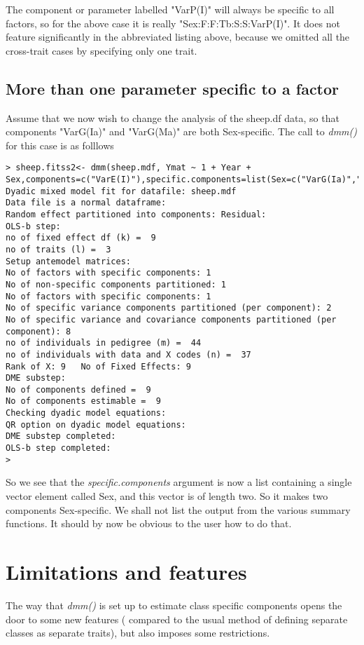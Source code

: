 \documentclass[titlepage]{article}  %
\begin{document}
The component or parameter labelled "VarP(I)" will always be specific to  all factors, so for the above case it is really "Sex:F:F:Tb:S:S:VarP(I)". It does not feature significantly in the abbreviated listing above, because we omitted all the cross-trait cases by specifying only one trait.

\subsection{More than one parameter specific to a factor}
Assume that we now wish to change the analysis of the sheep.df data, so that components "VarG(Ia)" and "VarG(Ma)" are both Sex-specific.  The call to {\em dmm()} for this case is as folllows
\begin{verbatim}
> sheep.fitss2<- dmm(sheep.mdf, Ymat ~ 1 + Year + Sex,components=c("VarE(I)"),specific.components=list(Sex=c("VarG(Ia)","VarG(Ma)")))
Dyadic mixed model fit for datafile: sheep.mdf  
Data file is a normal dataframe:
Random effect partitioned into components: Residual:
OLS-b step:
no of fixed effect df (k) =  9 
no of traits (l) =  3 
Setup antemodel matrices:
No of factors with specific components: 1 
No of non-specific components partitioned: 1 
No of factors with specific components: 1 
No of specific variance components partitioned (per component): 2 
No of specific variance and covariance components partitioned (per component): 8 
no of individuals in pedigree (m) =  44 
no of individuals with data and X codes (n) =  37 
Rank of X: 9   No of Fixed Effects: 9 
DME substep:
No of components defined =  9 
No of components estimable =  9 
Checking dyadic model equations:
QR option on dyadic model equations:
DME substep completed:
OLS-b step completed:
> 
\end{verbatim}
So we see that the {\em specific.components} argument  is now a list containing a single vector element called Sex, and this vector is of length two. So it makes two components Sex-specific. We shall not list the output from the various summary functions. It should by now be obvious to the user how to do that.

\section{Limitations and features}
The way that  {\em dmm()} is set up to estimate class specific components opens the door to some new features ( compared to the usual method of defining separate classes as separate traits), but also imposes some restrictions.
\end{document}
